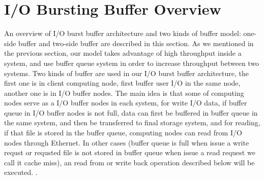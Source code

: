 \section{I/O Bursting Buffer Overview}
\label{sec:burst_buffer}


An overview of I/O burst buffer architecture and two kinds of buffer model: one-side buffer and two-side buffer are described in this section.
As we mentioned in the previous section, our model takes advantage of high throughput inside a system, and use buffer queue system in order to increase throughput between two systems.
Two kinds of buffer are used in our I/O burst buffer architecture, the first one is in client computing node, first buffer user I/O in the same node, another one is in I/O buffer nodes.
The main idea is that some of computing nodes serve as a I/O buffer nodes in each system, for write I/O data, if buffer queue in I/O buffer nodes is not full, data can first be buffered in buffer queue in the same system, and then be transferred to final storage system, and for reading, if that file is stored in the buffer queue, computing nodes can read from I/O nodes through Ethernet.
In other cases (buffer queue is full when issue a write requst or requsted file is not stored in buffer queue when issue a read request we call it cache miss), an read from or write back operation described below will be executed. 
.




